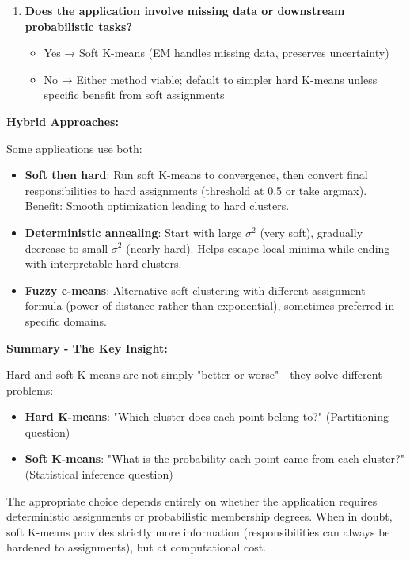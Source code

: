 \documentclass[12pt]{article}
\begin{document}
\begin{explanation}
\begin{enumerate}
    \item \textbf{Does the application involve missing data or downstream probabilistic tasks?}
    \begin{itemize}
        \item Yes → Soft K-means (EM handles missing data, preserves uncertainty)
        \item No → Either method viable; default to simpler hard K-means unless specific benefit from soft assignments
    \end{itemize}
\end{enumerate}

\textbf{Hybrid Approaches:}

Some applications use both:

\begin{itemize}
    \item \textbf{Soft then hard}: Run soft K-means to convergence, then convert final responsibilities to hard assignments (threshold at 0.5 or take argmax). Benefit: Smooth optimization leading to hard clusters.

    \item \textbf{Deterministic annealing}: Start with large $\sigma^2$ (very soft), gradually decrease to small $\sigma^2$ (nearly hard). Helps escape local minima while ending with interpretable hard clusters.

    \item \textbf{Fuzzy c-means}: Alternative soft clustering with different assignment formula (power of distance rather than exponential), sometimes preferred in specific domains.
\end{itemize}

\textbf{Summary - The Key Insight:}

Hard and soft K-means are not simply "better or worse" - they solve different problems:

\begin{itemize}
    \item \textbf{Hard K-means}: "Which cluster does each point belong to?" (Partitioning question)
    \item \textbf{Soft K-means}: "What is the probability each point came from each cluster?" (Statistical inference question)
\end{itemize}

The appropriate choice depends entirely on whether the application requires deterministic assignments or probabilistic membership degrees. When in doubt, soft K-means provides strictly more information (responsibilities can always be hardened to assignments), but at computational cost.

\end{explanation}
\end{document}
